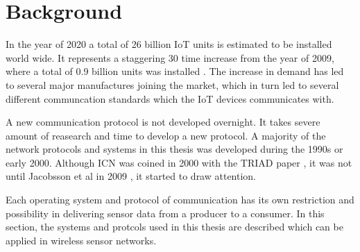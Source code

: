 \section{Background}

%
In the year of 2020 a total of 26 billion IoT units is estimated to be installed world wide. It represents a staggering 30 time increase from the year of 2009, where a total of 0.9 billion units was installed \cite{Gartner}. The increase in demand has led to several major manufactures joining the market, which in turn led to several different communcation standards which the IoT devices communicates with. 

A new communication protocol is not developed overnight. It takes severe amount of reasearch and time to develop a new protocol. A majority of the network protocols and systems in this thesis was developed during the 1990s or early 2000. Although ICN was coined in 2000 with the TRIAD paper \cite{TRIAD}, it was not until Jacobsson et al in 2009 \cite{Jacobson2009}, it started to draw attention.

Each operating system and protocol of communication has its own restriction and possibility in delivering sensor data from a producer to a consumer.
In this section, the systems and protcols used in this thesis are described which can be applied in wireless sensor networks.







%
